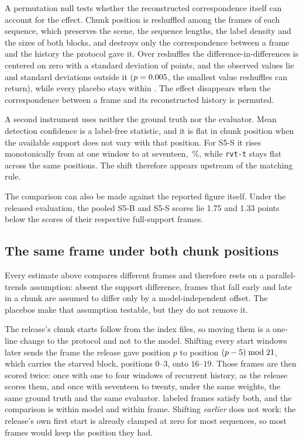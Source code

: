 \documentclass[10pt,twocolumn,letterpaper]{article}
\begin{document}
A permutation null tests whether the reconstructed correspondence itself can account for the effect.
Chunk position is
reshuffled among the frames of each sequence, which preserves the scene, the sequence
lengths, the label density and the sizes of both blocks, and destroys only the
correspondence between a frame and the history the protocol gave it. Over \chunkPermB{}
reshuffles the difference-in-differences is centered on zero with a standard deviation of
\chunkPermSd{} points, and the observed values lie \chunkPermZBase{} and
\chunkPermZSmall{} standard deviations outside it ($p=0.005$, the smallest value
\chunkPermB{} reshuffles can return), while every placebo stays within
\chunkPermPlaceboZ{}. The effect disappears when the correspondence between a frame and
its reconstructed history is permuted.

A second instrument uses neither the ground truth nor the evaluator. Mean detection
confidence is a label-free statistic, and it is flat in chunk position when the available
support does not vary with that position. For S5-S it rises monotonically from
\chunkConfOne{} at one window to \chunkConfFull{} at seventeen, \chunkConfPct\,\%, while
\texttt{rvt-t} stays flat across the same positions. The shift therefore appears upstream
of the matching rule.

The comparison can also be made against the reported figure itself. Under the released
evaluation, the pooled S5-B and S5-S scores lie 1.75 and 1.33 points below the scores of
their respective full-support frames.

\subsection{The same frame under both chunk positions}
\label{sup:paired}

Every estimate above compares different frames and therefore rests on a parallel-trends
assumption: absent the support difference, frames that fall early and late in a chunk are
assumed to differ only by a model-independent offset. The placebos make that
assumption testable, but they do not remove it.

The release's chunk starts follow from the index files, so moving them is a one-line change
to the protocol and not to the model. Shifting every start \ssmPairedShift{} windows later
sends the frame the release gave position $p$ to position $(p-5)\bmod
21{}$, which carries the starved block, positions $0$--$3$, onto $16$--$19$.
Those frames are then scored twice: once with one to four windows of recurrent history, as
the release scores them, and once with seventeen to twenty, under the same weights, the same
ground truth and the same evaluator. \ssmPairedN{} labeled frames satisfy both, and the
comparison is within model and within frame. Shifting \emph{earlier} does not work: the
release's own first start is already clamped at zero for most sequences, so most frames
would keep the position they had.
\end{document}
